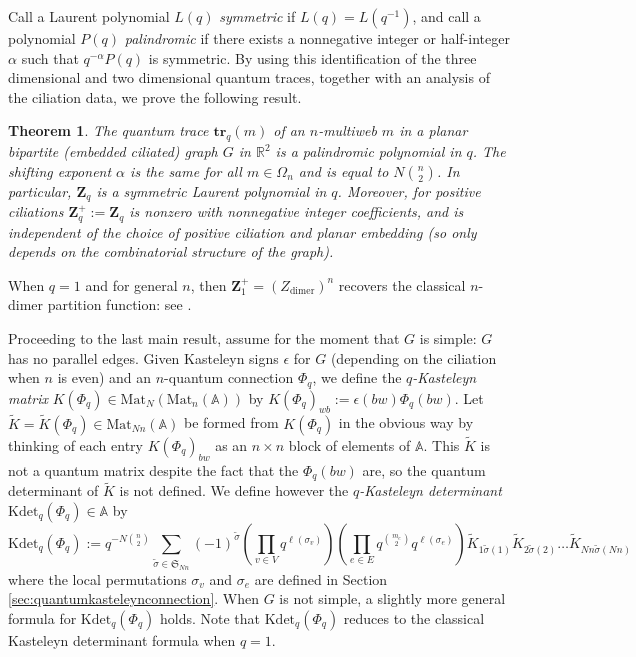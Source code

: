 \documentclass[12pt, reqno]{amsart}
\newtheorem{introtheo}{Theorem}
\theoremstyle{definition}
\renewcommand{\tilde}{\widetilde}
\newcommand{\Zq}{\mathbf{Z}_q}%
\newcommand{\R}{\mathbb{R}}%
\newcommand{\trq}{\mathbf{tr}_q}%
\newcommand{\Kdetq}{\mathrm{Kdet}_q}%
\newcommand{\Mat}{\mathrm{Mat}}%
\begin{document}
Call a Laurent polynomial $L(q)$ \emph{symmetric} if $L(q)=L(q^{-1})$, and call a polynomial $P(q)$ \emph{palindromic} if there exists a nonnegative integer or half-integer $\alpha$ such that $q^{-\alpha} P(q)$ is symmetric.  By using this identification of the three dimensional and two dimensional quantum traces, together with an analysis of the ciliation data, we prove the following result.

\begin{introtheo}
The quantum trace $\trq(m)$ of an $n$-multiweb $m$ in a planar bipartite (embedded ciliated) graph $G$ in $\R^2$ is a palindromic polynomial in $q$.    The shifting exponent $\alpha$ is the same for all $m\in\Omega_n$ and is equal to $N\binom{n}{2}$.    In particular, $\Zq$ is a symmetric Laurent polynomial in $q$.    Moreover, for positive ciliations $\Zq^+:=\Zq$ is nonzero with nonnegative integer coefficients, and is independent of the choice of positive ciliation and planar embedding (so only depends on the combinatorial structure of the graph).
\end{introtheo}

When $q=1$ and for general $n$, then $\mathbf{Z}_1^+=(Z_\mathrm{dimer})^n$ recovers the classical $n$-dimer partition function: see \cite{DKS}.

Proceeding to the last main result, assume for the moment that $G$ is simple: $G$ has no parallel edges.  Given Kasteleyn signs $\epsilon$ for $G$ (depending on the ciliation when $n$ is even) and an $n$-quantum connection $\Phi_q$, we define the \emph{$q$-Kasteleyn matrix} $K(\Phi_q)\in \Mat_N(\Mat_n(\mathbb{A}))$ by $K(\Phi_q)_{wb}:=\epsilon(bw)\Phi_q(bw)$.   Let  $\tilde{K}=\tilde{K}(\Phi_q)\in \Mat_{Nn}(\mathbb{A})$ be formed from $K(\Phi_q)$ in the obvious way by thinking of each entry $K(\Phi_q)_{bw}$ as an $n\times n$ block of elements of $\mathbb{A}$. This $\tilde{K}$ is not a quantum matrix despite the fact that the $\Phi_q(bw)$ are, so the quantum determinant of $\tilde K$ is not defined.   We define however the \emph{$q$-Kasteleyn determinant}  $\Kdetq(\Phi_q)\in\mathbb{A}$ by
$$
\Kdetq(\Phi_q):=q^{-N\binom{n}{2}}\sum_{\tilde{\sigma}\in\mathfrak{S}_{Nn}}(-1)^{\tilde{\sigma}}\left(\prod_{v\in V}q^{\ell(\sigma_v)}\right)\left(\prod_{e\in E}q^{\binom{m_e}{2}}q^{\ell(\sigma_e)}\right)\tilde{K}_{1\tilde{\sigma}(1)}\tilde{K}_{2\tilde{\sigma}(2)}\dots\tilde{K}_{Nn\tilde{\sigma}(Nn)}
$$
where the local permutations $\sigma_v$ and $\sigma_e$ are defined in Section \ref{sec:quantumkasteleynconnection}.  When $G$ is not simple, a slightly more general formula for $\Kdetq(\Phi_q)$ holds.  Note that $\Kdetq(\Phi_q)$ reduces to the classical Kasteleyn determinant formula when $q=1$.  
\end{document}
